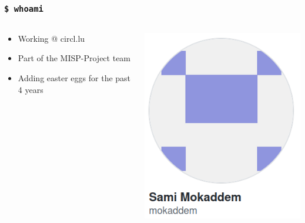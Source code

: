 
\begin{frame}[t,plain]
\titlepage
\end{frame}

\begin{frame}
    \frametitle{\texttt{\$ whoami}}
    \begin{columns}
        \begin{column}{0.7\textwidth}
            \begin{itemize}
                \item Working @ circl.lu
                \item Part of the MISP-Project team
                \item Adding easter eggs for the past 4 years
            \end{itemize}
        \end{column}
        \begin{column}{0.3\textwidth}
            \includegraphics[width=0.9\linewidth]{pictures/whoami.png}
        \end{column}
    \end{columns}
    \vspace*{0.75em}

\end{frame}
